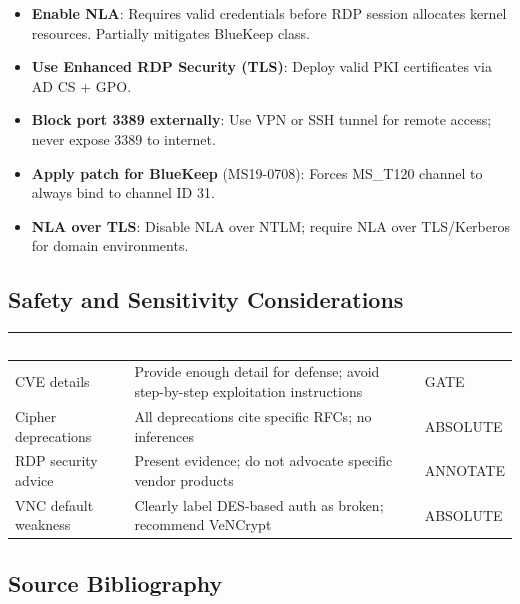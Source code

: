 \documentclass[11pt,letterpaper]{article}
\newcommand{\tableheader}[1]{\textbf{\sffamily\textcolor{white}{#1}}}
\begin{document}
\begin{itemize}
\item \textbf{Enable NLA}: Requires valid credentials before RDP session allocates kernel resources. Partially mitigates BlueKeep class.
\item \textbf{Use Enhanced RDP Security (TLS)}: Deploy valid PKI certificates via AD CS + GPO.
\item \textbf{Block port 3389 externally}: Use VPN or SSH tunnel for remote access; never expose 3389 to internet.
\item \textbf{Apply patch for BlueKeep} (MS19-0708): Forces MS\_T120 channel to always bind to channel ID 31.
\item \textbf{NLA over TLS}: Disable NLA over NTLM; require NLA over TLS/Kerberos for domain environments.
\end{itemize}

\subsection{Safety and Sensitivity Considerations}

\begin{center}
\begin{tabularx}{\textwidth}{L{4cm}XC{2cm}}
\toprule
{}
\tableheader{Area} & \tableheader{Consideration} & \tableheader{Type} \\
\midrule
CVE details & Provide enough detail for defense; avoid step-by-step exploitation instructions & GATE \\
Cipher deprecations & All deprecations cite specific RFCs; no inferences & ABSOLUTE \\
RDP security advice & Present evidence; do not advocate specific vendor products & ANNOTATE \\
VNC default weakness & Clearly label DES-based auth as broken; recommend VeNCrypt & ABSOLUTE \\
\bottomrule
\end{tabularx}
\end{center}

\subsection{Source Bibliography}
\end{document}
